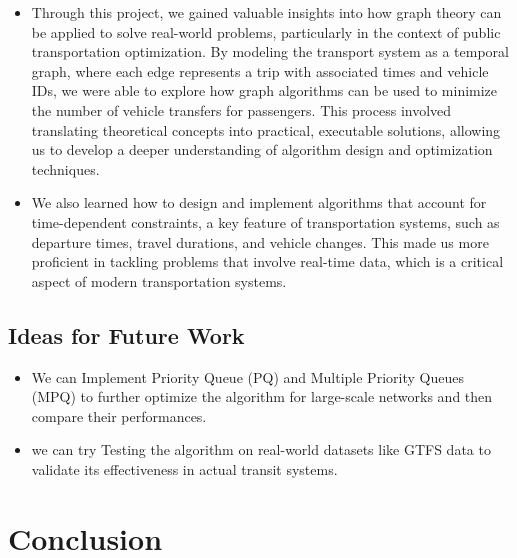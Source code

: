 \documentclass[a4paper,12pt]{article}
\begin{document}
\begin{itemize}
    \item Through this project, we gained valuable insights into how graph theory can be applied to solve real-world problems, particularly in the context of public transportation optimization. By modeling the transport system as a temporal graph, where each edge represents a trip with associated times and vehicle IDs, we were able to explore how graph algorithms can be used to minimize the number of vehicle transfers for passengers. This process involved translating theoretical concepts into practical, executable solutions, allowing us to develop a deeper understanding of algorithm design and optimization techniques.

    \item We also learned how to design and implement algorithms that account for time-dependent constraints, a key feature of transportation systems, such as departure times, travel durations, and vehicle changes. This made us more proficient in tackling problems that involve real-time data, which is a critical aspect of modern transportation systems. 
\end{itemize}

\subsection{Ideas for Future Work}
\begin{itemize}
    \item We can Implement Priority Queue (PQ) and Multiple Priority Queues (MPQ) to further optimize the algorithm for large-scale networks and then compare their performances.
    \item we can try Testing the algorithm on real-world datasets like GTFS data to validate its effectiveness in actual transit systems.
\end{itemize}

\section{Conclusion}
\end{document}
